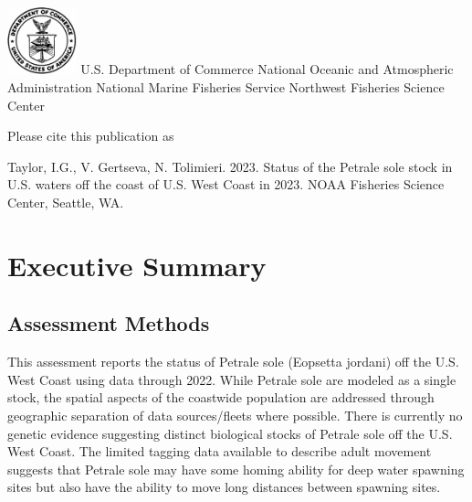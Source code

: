 \documentclass[
]{scrartcl}
\renewcommand*\contentsname{Table of contents}
\newcommand\contentsname{Table of contents}
\begin{document}
\begin{titlepage}
\begin{minipage}[b][\textheight][s]{\textwidth}
  \vspace{1\baselineskip}

  \includegraphics[width=2cm]{support_files/us_doc_logo.png}\newline
  U.S. Department of Commerce\newline
  National Oceanic and Atmospheric Administration\newline
  National Marine Fisheries Service\newline
  Northwest Fisheries Science Center\newline

  \end{minipage}
  \restoregeometry
  \end{titlepage}

\renewcommand*\contentsname{Table of contents}
{
\hypersetup{linkcolor=}
\setcounter{tocdepth}{3}
\tableofcontents
}
\listoffigures
\listoftables
\newpage{}

Please cite this publication as

Taylor, I.G., V. Gertseva, N. Tolimieri. 2023. Status of the Petrale
sole stock in U.S. waters off the coast of U.S. West Coast in 2023. NOAA
Fisheries Science Center, Seattle, WA.

\newpage{}

\section{Executive Summary}\label{executive-summary}

\subsection{Assessment Methods}\label{assessment-methods}

This assessment reports the status of Petrale sole (Eopsetta jordani)
off the U.S. West Coast using data through 2022. While Petrale sole are
modeled as a single stock, the spatial aspects of the coastwide
population are addressed through geographic separation of data
sources/fleets where possible. There is currently no genetic evidence
suggesting distinct biological stocks of Petrale sole off the U.S. West
Coast. The limited tagging data available to describe adult movement
suggests that Petrale sole may have some homing ability for deep water
spawning sites but also have the ability to move long distances between
spawning sites.
\end{document}
